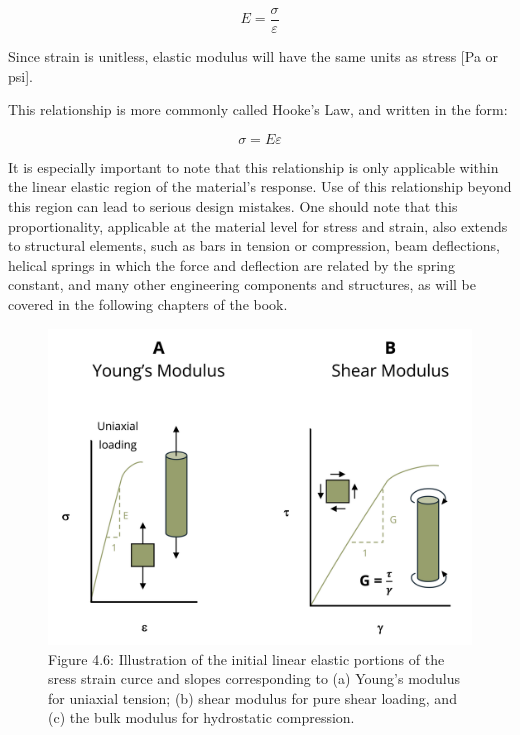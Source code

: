 \documentclass[
  letterpaper,
  DIV=11,
  numbers=noendperiod]{scrreprt}
\begin{document}
\[
E=\frac{\sigma}{\varepsilon}
\]

Since strain is unitless, elastic modulus will have the same units as
stress {[}Pa or psi{]}.

This relationship is more commonly called Hooke's Law, and written in
the form:

\[
\sigma=E \varepsilon
\]

It is especially important to note that this relationship is only
applicable within the linear elastic region of the material's response.
Use of this relationship beyond this region can lead to serious design
mistakes. One should note that this proportionality, applicable at the
material level for stress and strain, also extends to structural
elements, such as bars in tension or compression, beam deflections,
helical springs in which the force and deflection are related by the
spring constant, and many other engineering components and structures,
as will be covered in the following chapters of the book.

\begin{figure}[H]

{\centering \includegraphics[width=5.0625in,height=\textheight]{images/CH4 PNGs/4.6.png}

}

\caption{Figure 4.6: Illustration of the initial linear elastic portions
of the sress strain curce and slopes corresponding to (a) Young's
modulus for uniaxial tension; (b) shear modulus for pure shear loading,
and (c) the bulk modulus for hydrostatic compression.}

\end{figure}%
\end{document}

